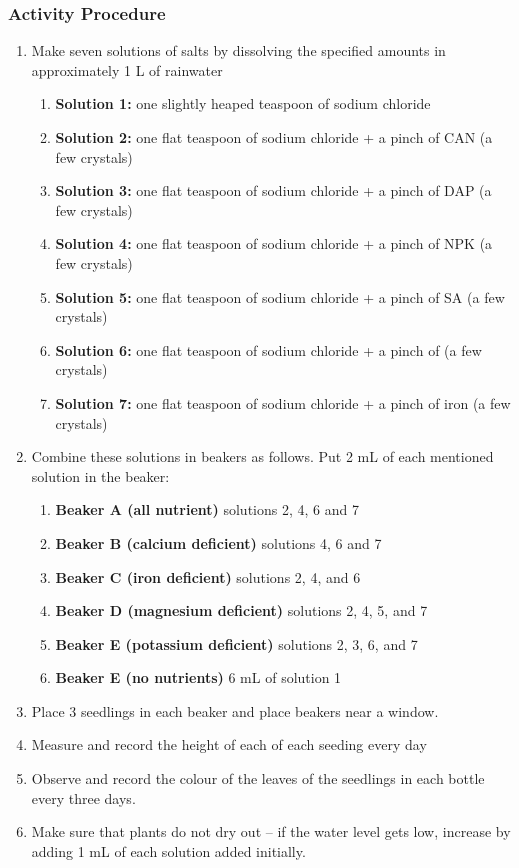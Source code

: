 \subsubsection*{Activity Procedure}
\begin{enumerate}
\item{Make seven solutions of salts by dissolving the specified amounts in approximately 1 L of rainwater}
\begin{enumerate}
\item{\textbf{Solution 1:} one slightly heaped teaspoon of sodium chloride}
\item{\textbf{Solution 2:} one flat teaspoon of sodium chloride + a pinch of CAN (a few crystals)}
\item{\textbf{Solution 3:} one flat teaspoon of sodium chloride + a pinch of DAP (a few crystals)}
\item{\textbf{Solution 4:} one flat teaspoon of sodium chloride + a pinch of NPK (a few crystals)}
\item{\textbf{Solution 5:} one flat teaspoon of sodium chloride + a pinch of SA (a few crystals)}
\item{\textbf{Solution 6:} one flat teaspoon of sodium chloride + a pinch of  (a few crystals)}
\item{\textbf{Solution 7:} one flat teaspoon of sodium chloride + a pinch of iron (a few crystals)}
\end{enumerate}
\item{Combine these solutions in beakers as follows. Put 2 mL of each mentioned solution in the beaker:}
\begin{enumerate}
\item{\textbf{Beaker A (all nutrient)} solutions 2, 4, 6 and 7}
\item{\textbf{Beaker B (calcium deficient)} solutions 4, 6 and 7}
\item{\textbf{Beaker C (iron deficient)} solutions 2, 4, and 6}
\item{\textbf{Beaker D (magnesium deficient)} solutions 2, 4, 5, and 7}
\item{\textbf{Beaker E (potassium deficient)} solutions 2, 3, 6, and 7}
\item{\textbf{Beaker E (no nutrients)} 6 mL of solution 1}
\end{enumerate}
\item{Place 3 seedlings in each beaker and place beakers near a window.}
\item{Measure and record the height of each of each seeding every day}
\item{Observe and record the colour of the leaves of the seedlings in each bottle every three days.}
\item{Make sure that plants do not dry out -- if the water level gets low, increase by adding 1 mL of each solution added initially.}
\end{enumerate}

